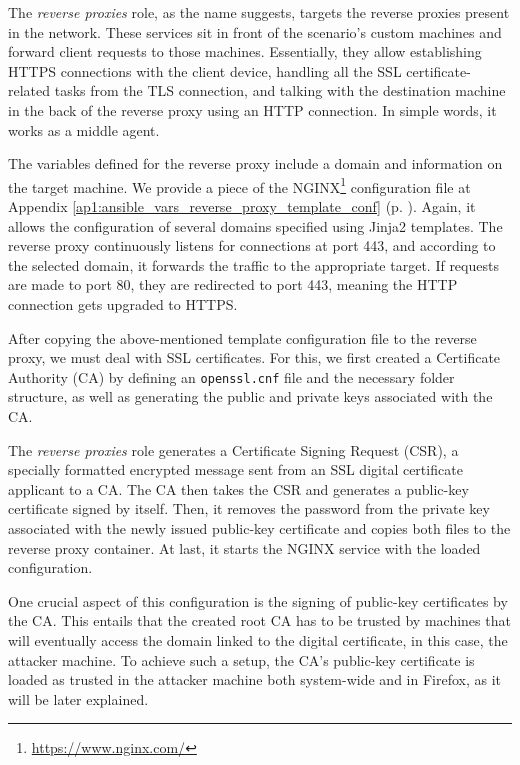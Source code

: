 The \textit{reverse proxies} role, as the name suggests, targets the reverse proxies present in the network. These services sit in front of the scenario's custom machines and forward client requests to those machines. Essentially, they allow establishing HTTPS connections with the client device, handling all the SSL certificate-related tasks from the TLS connection, and talking with the destination machine in the back of the reverse proxy using an HTTP connection. In simple words, it works as a middle agent.

The variables defined for the reverse proxy include a domain and information on the target machine. We provide a piece of the NGINX\footnote{\url{https://www.nginx.com/}} configuration file at Appendix \ref{ap1:ansible_vars_reverse_proxy_template_conf} (p. \pageref{ap1:ansible_vars_reverse_proxy_template_conf}). Again, it allows the configuration of several domains specified using Jinja2 templates. The reverse proxy continuously listens for connections at port 443, and according to the selected domain, it forwards the traffic to the appropriate target. If requests are made to port 80, they are redirected to port 443, meaning the HTTP connection gets upgraded to HTTPS.

After copying the above-mentioned template configuration file to the reverse proxy, we must deal with SSL certificates. For this, we first created a Certificate Authority (CA) by defining an \texttt{openssl.cnf} file and the necessary folder structure, as well as generating the public and private keys associated with the CA.

The \textit{reverse proxies} role generates a Certificate Signing Request (CSR), a specially formatted encrypted message sent from an SSL digital certificate applicant to a CA. The CA then takes the CSR and generates a public-key certificate signed by itself. Then, it removes the password from the private key associated with the newly issued public-key certificate and copies both files to the reverse proxy container. At last, it starts the NGINX service with the loaded configuration. 

One crucial aspect of this configuration is the signing of public-key certificates by the CA. This entails that the created root CA has to be trusted by machines that will eventually access the domain linked to the digital certificate, in this case, the attacker machine. To achieve such a setup, the CA's public-key certificate is loaded as trusted in the attacker machine both system-wide and in Firefox, as it will be later explained.

